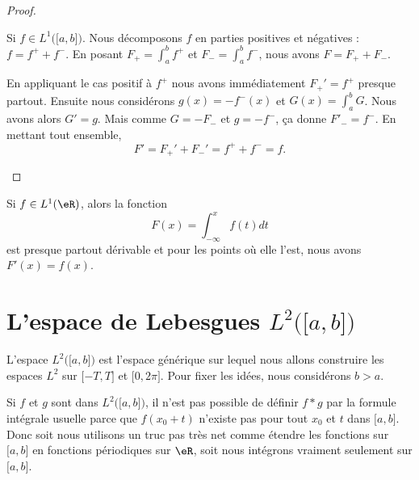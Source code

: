 \begin{proof}
\begin{subproof}
		Si \( f\in L^1\big( \mathopen[ a,b\mathclose] \big)\). Nous décomposons \( f\) en parties positives et négatives : \( f=f^++f^-\). En posant \( F_+=\int_a^b f^+\) et \( F_-=\int_a^bf^-\), nous avons \( F=F_++F_-\).

		En appliquant le cas positif à \( f^+\) nous avons immédiatement \( F_+'=f^+\) presque partout. Ensuite nous considérons \( g(x)=-f^-(x)\) et \( G(x)=\int_a^bG\). Nous avons alors \( G'=g\). Mais comme \( G=-F_-\) et \( g=-f^-\), ça donne \( F'_-=f^-\). En mettant tout ensemble,
		\begin{equation}
			F'=F_+'+F_-'=f^++f^-=f.
		\end{equation}
	\end{subproof}
\end{proof}

\begin{proposition} \label{PropJLnPpaw}
	Si \( f\in L^1(\eR)\), alors la fonction
	\begin{equation}
		F(x)=\int_{-\infty}^xf(t)dt
	\end{equation}
	est presque partout dérivable et pour les points où elle l'est, nous avons \( F'(x)=f(x)\).
\end{proposition}



\section{L'espace de Lebesgues \( L^2\big( \mathopen[ a , b \mathclose] \big)\)}
\label{SECooUMEPooPMemJz}

L'espace \( L^2\big( \mathopen[ a , b \mathclose] \big)\) est l'espace générique sur lequel nous allons construire les espaces \( L^2\) sur \( \mathopen[ -T , T \mathclose]\) et \( \mathopen[ 0 , 2\pi \mathclose]\). Pour fixer les idées, nous considérons \( b>a\).

Si \( f\) et \( g\) sont dans \( L^2\big( \mathopen[ a , b \mathclose] \big)\), il n'est pas possible de définir \( f*g\) par la formule intégrale usuelle parce que \( f(x_0+t)\) n'existe pas pour tout \( x_0\) et \( t\) dans \( \mathopen[ a , b \mathclose]\). Donc soit nous utilisons un truc pas très net comme étendre les fonctions sur \( \mathopen[ a , b \mathclose]\) en fonctions périodiques sur \( \eR\), soit nous intégrons vraiment seulement sur \( \mathopen[ a , b \mathclose]\).

